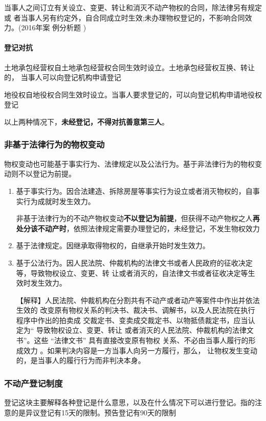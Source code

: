 \documentclass[UTF8,12pt]{ctexart}
\numberwithin{equation}{section} %
\numberwithin{figure}{section}
\numberwithin{table}{section}
\begin{document}
	当事人之间订立有关设立、变更、转让和消灭不动产物权的合同，除法律另有规定或 者当事人另有约定外，自合同成立时生效;未办理物权登记的，不影响合同效力。(2016年案 例分析题 )
	
	\paragraph{登记对抗} 
	土地承包经营权自土地承包经营权合同生效时设立。土地承包经营权互换、转让的， 当事人可以向登记机构申请登记
	
	地役权自地役权合同生效时设立。当事人要求登记的，可以向登记机构申请地役权登记
	
	以上两种情况下，\textbf{未经登记，不得对抗善意第三人}。
	
	\subsubsection{非基于法律行为的物权变动}
	物权变动也可能基于事实行为、法律规定以及公法行为。基于非法律行为的物权变动则不以登记为前提。
	\begin{enumerate}
		\item 基于事实行为。因合法建造、拆除房屋等事实行为设立或者消灭物权的，自事实行为成就时发生效力。
		
		非基于法律行为的不动产物权变动\textbf{不以登记为前提}，但获得不动产物权之人\textbf{再处分该不动产时}，依照法律规定需要办理登记的，未经登记，不发生物权效力
		
		\item 基于法律规定。因继承取得物权的，自继承开始时发生效力。
		
		\item 基于公法行为。因人民法院、仲裁机构的法律文书或者人民政府的征收决定等，导致物权设立、变更、转 让或者消灭的，自法律文书或者征收决定等生效时发生效力。
		
		【解释】人民法院、仲裁机构在分割共有不动产或者动产等案件中作出并依法生效的 改变原有物权关系的判决书、裁决书、调解书，以及人民法院在执行程序中作出的拍卖成 交裁定书、变卖成交裁定书、以物抵债裁定书，应当认定为“ 导致物权设立、变更、转让 或者消灭的人民法院、仲裁机构的法律文书”。这些 “法律文书” 具有直接改变原有物权 关系、不必由当事人履行的形成效力 。如果判决内容是一方当事人向另一方履行，那么， 让物权发生变动的，是当事人的履行行为而非判决本身。
		
	\end{enumerate}

	\subsubsection{不动产登记制度}
	登记这块主要解释各种登记是什么意思，以及在什么情况下可以进行登记。指的注意的是异议登记有15天的限制。预告登记有90天的限制
	
\end{document}
